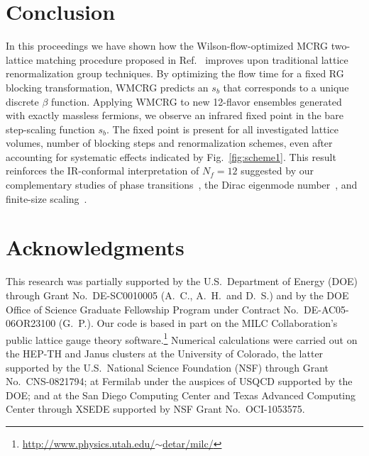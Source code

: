 \documentclass{PoS}
\newcommand{\be}{\ensuremath{\beta} }
\newcommand{\fig}[1]{Fig.~\ref{#1}}
\newcommand{\refcite}[1]{Ref.~\cite{#1}}
\begin{document}
\section{Conclusion} %
In this proceedings we have shown how the Wilson-flow-optimized MCRG two-lattice matching procedure proposed in \refcite{Petropoulos:2012mg} improves upon traditional lattice renormalization group techniques.
By optimizing the flow time for a fixed RG blocking transformation, WMCRG predicts an $s_b$ that corresponds to a unique discrete \be function.
Applying WMCRG to new 12-flavor ensembles generated with exactly massless fermions, we observe an infrared fixed point in the bare step-scaling function $s_b$.
The fixed point is present for all investigated lattice volumes, number of blocking steps and renormalization schemes, even after accounting for systematic effects indicated by \fig{fig:scheme1}.
This result reinforces the IR-conformal interpretation of $N_f = 12$ suggested by our complementary studies of phase transitions~\cite{Schaich:2012fr, Hasenfratz:2013uha}, the Dirac eigenmode number~\cite{Cheng:2013eu, Cheng:2013bca}, and finite-size scaling~\cite{Hasenfratz:2013eka}.



\section*{Acknowledgments} %
This research was partially supported by the U.S.~Department of Energy (DOE) through Grant No.~DE-SC0010005 (A.~C., A.~H.\ and D.~S.) and by the DOE Office of Science Graduate Fellowship Program under Contract No.~DE-AC05-06OR23100 (G.~P.).
Our code is based in part on the MILC Collaboration's public lattice gauge theory software.\footnote{\href{http://www.physics.utah.edu/~detar/milc/}{http://www.physics.utah.edu/$\sim$detar/milc/}}
Numerical calculations were carried out on the HEP-TH and Janus clusters at the University of Colorado, the latter supported by the U.S.~National Science Foundation (NSF) through Grant No.~CNS-0821794; at Fermilab under the auspices of USQCD supported by the DOE; and at the San Diego Computing Center and Texas Advanced Computing Center through XSEDE supported by NSF Grant No.~OCI-1053575.





\end{document}
